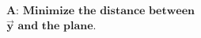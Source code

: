 \documentclass[preview]{standalone}
\begin{document}
\begin{align*}
\textbf{A:} \,\, \textbf{Minimize} \,\, \textbf{the distance between} \\ \mathbf{\vec{y}} \,\, \textbf{and the plane.}
\end{align*}
\end{document}
